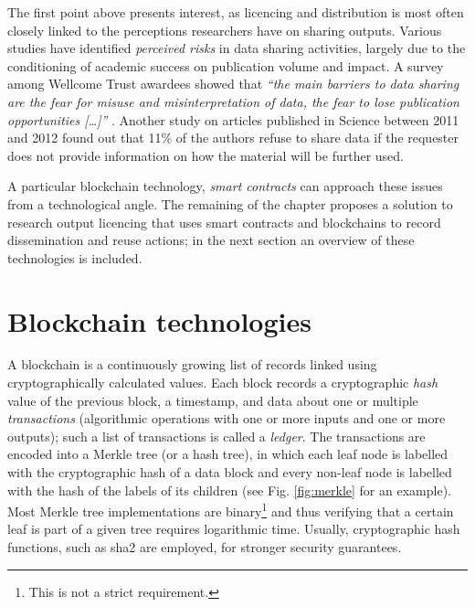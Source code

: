 The first point above presents interest, as licencing and distribution is most often closely linked to the perceptions researchers have on sharing outputs. Various studies \cite{federer,kim} have identified \emph{perceived risks} in data sharing activities, largely due to the conditioning of academic success on publication volume and impact. A survey among Wellcome Trust awardees showed that \emph{``the main barriers to data sharing are  the fear for misuse and misinterpretation of data, the fear to lose publication opportunities [\ldots]''} \cite{wellcome}. Another study on articles published in Science between 2011 and 2012 found out that 11\% of the authors refuse to share data if the requester does not provide information on how the material will be further used\cite{stodden}.

A particular blockchain technology, \emph{smart contracts} can approach these issues from a technological angle. The remaining of the chapter proposes a solution to research output licencing that uses smart contracts and blockchains to record dissemination and reuse actions; in the next section an overview of these technologies is included.

\newpage

\section{Blockchain technologies}
\label{sec:blockchain}

A blockchain is a continuously growing list of records linked using cryptographically calculated values. Each block records a cryptographic \emph{hash} value of the previous block, a timestamp, and data about one or multiple \emph{transactions} (algorithmic operations with one or more inputs and one or more outputs); such a list of transactions is called a \emph{ledger}. The transactions are encoded into a Merkle tree (or a hash tree), in which each leaf node is labelled with the cryptographic hash of a data block and every non-leaf node is labelled with the hash of the labels of its children (see Fig. \ref{fig:merkle} for an example). Most Merkle tree implementations are binary\footnote{This is not a strict requirement.} and thus verifying that a certain leaf is part of a given tree requires logarithmic time. Usually, cryptographic hash functions, such as \gls{sha2}\cite{sha2} are employed, for stronger security guarantees.

